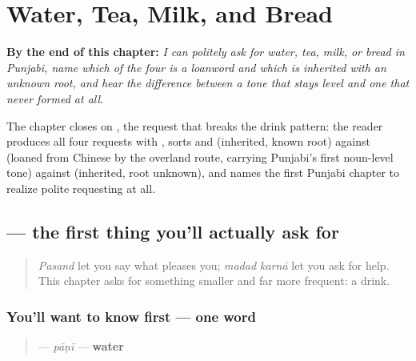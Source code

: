 
\chapter{Water, Tea, Milk, and Bread}
\label{ch:pa-request-food-drink}

\begin{chapteropening}
\textbf{By the end of this chapter:} \emph{I can politely ask for water, tea, milk, or bread in Punjabi, name which of the four is a loanword and which is inherited with an unknown root, and hear the difference between a tone that stays level and one that never formed at all.}

The chapter closes on , the request that breaks the drink pattern: the reader produces all four requests with  , sorts  and  (inherited, known root) against  (loaned from Chinese by the overland route, carrying Punjabi's first noun-level tone) against  (inherited, root unknown), and names the first Punjabi chapter to realize polite requesting at all.
\end{chapteropening}

\section[\texorpdfstring{\pa{ਪਾਣੀ} (pāṇī)}{ਪਾਣੀ (pāṇī)}]{ — the first thing you'll actually ask for}

\label{lesson:PA-C10-paani}



\begin{quote}
\emph{Pasand} let you say what pleases you; \emph{madad karnā} let you ask for help. This chapter asks for something smaller and far more frequent: a drink.
\end{quote}

\subsection*{You'll want to know first — one word}
\begin{quote}
\textbf{} — \emph{pāṇī} — \textbf{water}
\end{quote}

